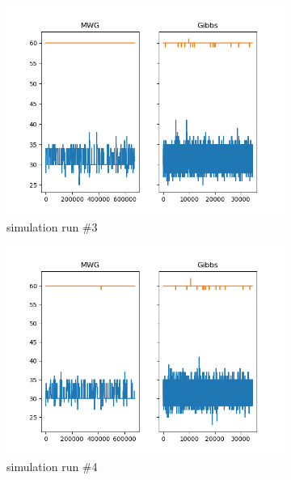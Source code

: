 \begin{figure}[H]
\begin{subfigure}{.3\textwidth}
    	\includegraphics[width=\linewidth]{../../plots/Trace_post_burnin_M3_N100_NMCMC3_seed2_diffind2.png}
    	\caption{simulation run \#3}
	\end{subfigure}
	\begin{subfigure}{.3\textwidth}
	    \centering
    	\includegraphics[width=\linewidth]{../../plots/Trace_post_burnin_M3_N100_NMCMC3_seed3_diffind2.png}
    	\caption{simulation run \#4}
	\end{subfigure}
	\begin{subfigure}{.3\textwidth}
	    \centering

\end{subfigure}
\end{figure}
